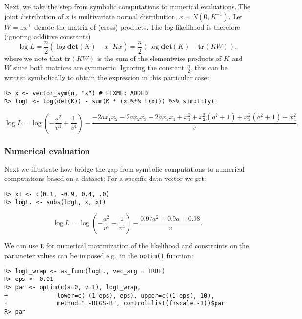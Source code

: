 Next, we take the step from symbolic computations to numerical
evaluations. The joint distribution of \(x\) is multivariate normal
distribution, \(x\sim N(0, K^{-1})\). Let \(W=x x^\top\) denote the
matrix of (cross) products. The log-likelihood is therefore (ignoring
additive constants)
\[ 
\log L = \frac n 2 (\log \mathbf{det}(K) - x^\top K x) = \frac n 2 (\log \mathbf{det}(K) - \mathbf{tr}(K W)), 
\]
where we note that \(\mathbf{tr}(KW)\) is the
sum of the elementwise products of \(K\) and \(W\) since both matrices are
symmetric. Ignoring the constant \(\frac n 2\),
this can be written symbolically to obtain the expression in
this particular case:

\begin{verbatim}
R> x <- vector_sym(n, "x") # FIXME: ADDED
R> logL <- log(det(K)) - sum(K * (x %*% t(x))) %>% simplify()
\end{verbatim}

\[
\log L = \log{\left(- \frac{a^{2}}{v^{4}} + \frac{1}{v^{4}} \right)} - \frac{- 2 a x_{1} x_{2} - 2 a x_{2} x_{3} - 2 a x_{3} x_{4} + x_{1}^{2} + x_{2}^{2} \left(a^{2} + 1\right) + x_{3}^{2} \left(a^{2} + 1\right) + x_{4}^{2}}{v} .
\]

\hypertarget{numerical-evaluation}{%
\subsubsection{Numerical evaluation}\label{numerical-evaluation}}

Next we illustrate how bridge the gap from symbolic computations to numerical computations based on a dataset:
For a specific data vector we get:

\begin{verbatim}
R> xt <- c(0.1, -0.9, 0.4, .0)
R> logL. <- subs(logL, x, xt) 
\end{verbatim}

\[
\log L = \log{\left(- \frac{a^{2}}{v^{4}} + \frac{1}{v^{4}} \right)} - \frac{0.97 a^{2} + 0.9 a + 0.98}{v} .
\]

We can use \texttt{R} for numerical maximization of the likelihood and constraints on the
parameter values can be imposed e.g.~in the \texttt{optim()} function:

\begin{verbatim}
R> logL_wrap <- as_func(logL., vec_arg = TRUE)
R> eps <- 0.01
R> par <- optim(c(a=0, v=1), logL_wrap, 
+              lower=c(-(1-eps), eps), upper=c((1-eps), 10),
+              method="L-BFGS-B", control=list(fnscale=-1))$par
R> par
\end{verbatim}


